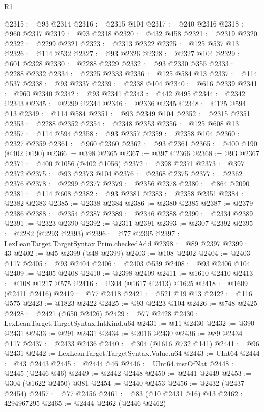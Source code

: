 \begin{lexlean}{R1}
\begin{coremodule}
@2315 := @93 @2314
@2316 := @2315 @104
@2317 := @240 @2316
@2318 := @960 @2317
@2319 := @93 @2318
@2320 := @432 @458
@2321 := @2319 @2320
@2322 := @2299 @2321
@2323 := @2313 @2322
@2325 := @125 @537 @13
@2326 := @114 @532
@2327 := @93 @2326
@2328 := @2327 @104
@2329 := @601 @2328
@2330 := @2288 @2329
@2332 := @93 @2330 @355
@2333 := @2288 @2332
@2334 := @2325 @2333
@2336 := @125 @584 @13
@2337 := @114 @537
@2338 := @93 @2337
@2339 := @2338 @104
@2340 := @616 @2339
@2341 := @960 @2340
@2342 := @93 @2341
@2343 := @442 @495
@2344 := @2342 @2343
@2345 := @2299 @2344
@2346 := @2336 @2345
@2348 := @125 @594 @13
@2349 := @114 @584
@2351 := @93 @2349 @104
@2352 := @2315 @2351
@2353 := @2288 @2352
@2354 := @2348 @2353
@2356 := @125 @608 @13
@2357 := @114 @594
@2358 := @93 @2357
@2359 := @2358 @104
@2360 := @2327 @2359
@2361 := @960 @2360
@2362 := @93 @2361
@2365 := @400 @190 (@402 @190)
@2366 := @398 @2365
@2367 := @397 @2366
@2368 := @93 @2367
@2371 := @400 @1056 (@402 @1056)
@2372 := @398 @2371
@2373 := @397 @2372
@2375 := @93 @2373 @104
@2376 := @2368 @2375
@2377 := @2362 @2376
@2378 := @2299 @2377
@2379 := @2356 @2378
@2380 := @864 @2090
@2381 := @114 @608
@2382 := @93 @2381
@2383 := @2358 @2351
@2384 := @2382 @2383
@2385 := @2338 @2384
@2386 := @2380 @2385
@2387 := @2379 @2386
@2388 := @2354 @2387
@2389 := @2346 @2388
@2390 := @2334 @2389
@2391 := @2323 @2390
@2392 := @2311 @2391
@2393 := @2307 @2392
@2395 := @2282 (@2293 @2393)
@2396 := @77 @2395
@2397 := LexLeanTarget.TargetSyntax.Prim.checkedAdd
@2398 := @89 @2397
@2399 := 43
@2402 := @45 @2399 (@48 @2399)
@2403 := @108 @2402
@2404 := @2403 @117
@2405 := @93 @2404
@2406 := @2403 @539
@2408 := @93 @2406 @104
@2409 := @2405 @2408
@2410 := @2398 @2409
@2411 := @1610 @2410
@2413 := @108 @1217 @575
@2416 := @304 (@1617 @2413) @1625
@2418 := @1609 (@2411 @2416)
@2419 := @77 @2418
@2421 := @521 @19 @13
@2422 := @116 @575
@2423 := @1823 @2422
@2425 := @93 @2423 @104
@2426 := @748 @2425
@2428 := @2421 (@650 @2426)
@2429 := @77 @2428
@2430 := LexLeanTarget.TargetSyntax.IntKind.u64
@2431 := @11 @2430
@2432 := @390 @2431
@2433 := @291 @2431
@2434 := @2016 @2430
@2436 := @89 @2434 @117
@2437 := @2433 @2436
@2440 := @304 (@1616 @732 @141)
@2441 := @96 @2431
@2442 := LexLeanTarget.TargetSyntax.Value.u64
@2443 := UInt64
@2444 := @43 @2443
@2445 := @2444 @46
@2446 := UInt64.instOfNat
@2448 := @2445 (@2446 @46)
@2449 := @2442 @2448
@2450 := @2441 @2449
@2453 := @304 (@1622 @2450) @381
@2454 := @2440 @2453
@2456 := @2432 (@2437 @2454)
@2457 := @77 @2456
@2461 := @83 (@10 @2431 @16) @13
@2462 := 4294967295
@2465 := @2444 @2462 (@2446 @2462)

\end{coremodule}
\end{lexlean}
